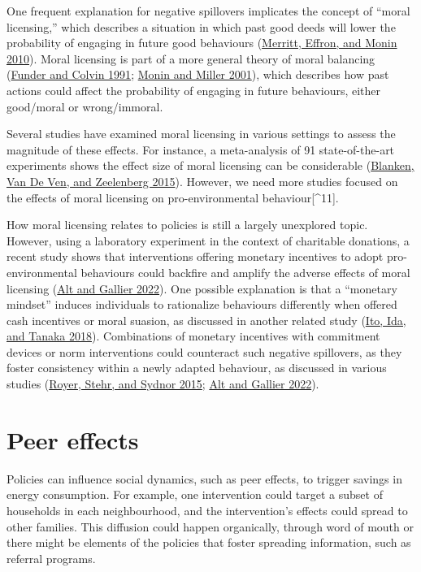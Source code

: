 \documentclass[
  11pt,
  captions=heading]{scrreport}
\begin{document}
One frequent explanation for negative spillovers implicates the concept
of ``moral licensing,'' which describes a situation in which past good
deeds will lower the probability of engaging in future good behaviours
(\protect\hyperlink{ref-merritt2010moral}{Merritt, Effron, and Monin
2010}). Moral licensing is part of a more general theory of moral
balancing (\protect\hyperlink{ref-funder1991explorations}{Funder and
Colvin 1991}; \protect\hyperlink{ref-monin2001moral}{Monin and Miller
2001}), which describes how past actions could affect the probability of
engaging in future behaviours, either good/moral or wrong/immoral.

Several studies have examined moral licensing in various settings to
assess the magnitude of these effects. For instance, a meta-analysis of
91 state-of-the-art experiments shows the effect size of moral licensing
can be considerable (\protect\hyperlink{ref-blanken2015meta}{Blanken,
Van De Ven, and Zeelenberg 2015}). However, we need more studies focused
on the effects of moral licensing on pro-environmental
behaviour{[}\^{}11{]}.

How moral licensing relates to policies is still a largely unexplored
topic. However, using a laboratory experiment in the context of
charitable donations, a recent study shows that interventions offering
monetary incentives to adopt pro-environmental behaviours could backfire
and amplify the adverse effects of moral licensing
(\protect\hyperlink{ref-alt2022incentives}{Alt and Gallier 2022}). One
possible explanation is that a ``monetary mindset'' induces individuals
to rationalize behaviours differently when offered cash incentives or
moral suasion, as discussed in another related study
(\protect\hyperlink{ref-ito2018moral}{Ito, Ida, and Tanaka 2018}).
Combinations of monetary incentives with commitment devices or norm
interventions could counteract such negative spillovers, as they foster
consistency within a newly adapted behaviour, as discussed in various
studies (\protect\hyperlink{ref-royer2015incentives}{Royer, Stehr, and
Sydnor 2015}; \protect\hyperlink{ref-alt2022incentives}{Alt and Gallier
2022}).

\hypertarget{peer-effects}{%
\section{Peer effects}\label{peer-effects}}

Policies can influence social dynamics, such as peer effects, to trigger
savings in energy consumption. For example, one intervention could
target a subset of households in each neighbourhood, and the
intervention's effects could spread to other families. This diffusion
could happen organically, through word of mouth or there might be
elements of the policies that foster spreading information, such as
referral programs.
\end{document}
